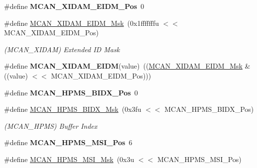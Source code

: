 \begin{DoxyCompactItemize}
\#define {\bfseries M\+C\+A\+N\+\_\+\+X\+I\+D\+A\+M\+\_\+\+E\+I\+D\+M\+\_\+\+Pos}~0
\item 
\mbox{\label{group__SAMV71__MCAN_gafa77f6b4776e8c20016b1b1293f02176}} 
\#define \mbox{\hyperlink{group__SAMV71__MCAN_gafa77f6b4776e8c20016b1b1293f02176}{M\+C\+A\+N\+\_\+\+X\+I\+D\+A\+M\+\_\+\+E\+I\+D\+M\+\_\+\+Msk}}~(0x1fffffffu $<$$<$ M\+C\+A\+N\+\_\+\+X\+I\+D\+A\+M\+\_\+\+E\+I\+D\+M\+\_\+\+Pos)
\begin{DoxyCompactList}\small\item\em (M\+C\+A\+N\+\_\+\+X\+I\+D\+AM) Extended ID Mask \end{DoxyCompactList}\item 
\mbox{\label{group__SAMV71__MCAN_ga6c1cc6ad970bcea416d60f22f4ff413c}} 
\#define {\bfseries M\+C\+A\+N\+\_\+\+X\+I\+D\+A\+M\+\_\+\+E\+I\+DM}(value)~((\mbox{\hyperlink{group__SAMV71__MCAN_gafa77f6b4776e8c20016b1b1293f02176}{M\+C\+A\+N\+\_\+\+X\+I\+D\+A\+M\+\_\+\+E\+I\+D\+M\+\_\+\+Msk}} \& ((value) $<$$<$ M\+C\+A\+N\+\_\+\+X\+I\+D\+A\+M\+\_\+\+E\+I\+D\+M\+\_\+\+Pos)))
\item 
\mbox{\label{group__SAMV71__MCAN_ga8a53a49e147fe508762c1a2ff222999f}} 
\#define {\bfseries M\+C\+A\+N\+\_\+\+H\+P\+M\+S\+\_\+\+B\+I\+D\+X\+\_\+\+Pos}~0
\item 
\mbox{\label{group__SAMV71__MCAN_ga01efa314ddc18c7c9e4d0b0fdeed5508}} 
\#define \mbox{\hyperlink{group__SAMV71__MCAN_ga01efa314ddc18c7c9e4d0b0fdeed5508}{M\+C\+A\+N\+\_\+\+H\+P\+M\+S\+\_\+\+B\+I\+D\+X\+\_\+\+Msk}}~(0x3fu $<$$<$ M\+C\+A\+N\+\_\+\+H\+P\+M\+S\+\_\+\+B\+I\+D\+X\+\_\+\+Pos)
\begin{DoxyCompactList}\small\item\em (M\+C\+A\+N\+\_\+\+H\+P\+MS) Buffer Index \end{DoxyCompactList}\item 
\mbox{\label{group__SAMV71__MCAN_ga51c55f8df47e99582c7e9ba4b8411e77}} 
\#define {\bfseries M\+C\+A\+N\+\_\+\+H\+P\+M\+S\+\_\+\+M\+S\+I\+\_\+\+Pos}~6
\item 
\mbox{\label{group__SAMV71__MCAN_ga21ba73996601119744de6b8be7f349c0}} 
\#define \mbox{\hyperlink{group__SAMV71__MCAN_ga21ba73996601119744de6b8be7f349c0}{M\+C\+A\+N\+\_\+\+H\+P\+M\+S\+\_\+\+M\+S\+I\+\_\+\+Msk}}~(0x3u $<$$<$ M\+C\+A\+N\+\_\+\+H\+P\+M\+S\+\_\+\+M\+S\+I\+\_\+\+Pos)

\end{DoxyCompactItemize}

